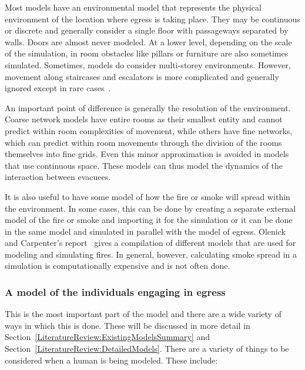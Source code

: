 Most models have an environmental model that represents the physical environment of the location where egress is taking place. They may be continuous or discrete and generally consider a single floor with passageways separated by walls. Doors are almost never modeled. At a lower level, depending on the scale of the simulation, in room obstacles like pillars or furniture are also sometimes simulated. Sometimes, models do consider multi-storey environments. However, movement along staircases and escalators is more complicated and generally ignored except in rare cases~\cite{Kinsey:2009tg,Klupfel:2003wa}.


An important point of difference is generally the resolution of the environment. Coarse network models have entire rooms as their smallest entity and cannot predict within room complexities of movement, while others have fine networks, which can predict within room movements through the division of the rooms themselves into fine grids. Even this minor approximation is avoided in models that use continuous space. These models can thus model the dynamics of the interaction between evacuees.

It is also useful to have some model of how the fire or smoke will spread within the environment. In some cases, this can be done by creating a separate external model of the fire or smoke and importing it for the simulation or it can be done in the same model and simulated in parallel with the model of egress. Olenick and Carpenter's report~\cite{Olenick:2003daa} gives a compilation of different models that are used for modeling and simulating fires. In general, however, calculating smoke spread in a simulation is computationally expensive and is not often done.



\subsubsection{A model of the individuals engaging in egress}

This is the most important part of the model and there are a wide variety of ways in which this is done. These will be discussed in more detail in Section~\ref{LiteratureReview:ExistingModelsSummary} and Section~\ref{LiteratureReview:DetailedModels}. There are a variety of things to be considered when a human is being modeled. These include:

